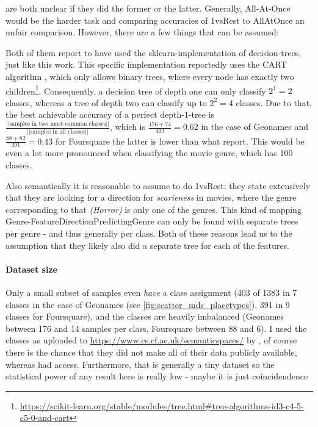 \cite{Ager2018, Alshaikh2020} are both unclear if they did the former or the latter. Generally, All-At-Once would be the harder task and comparing accuracies of 1vsRest to AllAtOnce an unfair comparison. However, there are a few things that can be assumed:

Both of them report to have used the sklearn-implementation of decision-trees, just like this work. This specific implementation reportedly uses the CART algorithm \cite{breiman1984classification}, which only allows binary trees, where every node has exactly two children\footnote{\url{https://scikit-learn.org/stable/modules/tree.html\#tree-algorithms-id3-c4-5-c5-0-and-cart}}. Consequently, a decision tree of depth one can only classify $2^1 = 2$ classes, whereas a tree of depth two can classify up to $2^2=4$ classes. 
Due to that, the best achievable accuracy of a perfect depth-1-tree is $\frac{\text{||samples in two most common classes||}}{\text{||samples in all classes||}}$, which is $\frac{176+74}{403} = 0.62$ in the case of Geonames and $\frac{88+82}{391} = 0.43$ for Foursquare  the latter is lower than what \cite{Alshaikh2020} report. This would be even a lot more pronounced when classifying the movie genre, which has 100 classes. 

Also semantically it is reasonable to assume to do 1vsRest: they state extensively that they are looking for a direction for \textit{scarieness} in movies, where the genre corresponding to that \textit{(Horror)} is only one of the genres. This kind of mapping Genre-FeatureDirectionPredictingGenre can only be found with separate trees per genre - and thus generally per class. Both of these reasons lead us to the assumption that they likely also did a separate tree for each of the features.

\paragraph{Dataset size}
Only a small subset of samples even \textit{have} a class assignment (403 of 1383 in 7 classes in the case of Geonames (see \autoref{fig:scatter_mds_placetypes}), 391 in 9 classes for Foursquare), and the classes are heavily imbalanced (Geonames between 176 and 14 samples per class, Foursquare between 88 and 6). I used the classes as uploaded to \url{https://www.cs.cf.ac.uk/semanticspaces/} by \cite{Derrac2015}, of course there is the chance that they did not make all of their data publicly available, whereas \cite{Ager2018, Alshaikh2020} had access. Furthermore, that is generally a tiny dataset so the statistical power of any result here is really low - maybe it is just coincidendence


